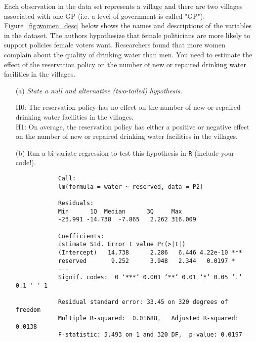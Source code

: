 \documentclass[12pt,letterpaper]{article}
\begin{document}
	\noindent Each observation in the data set represents a village and there are two villages associated with one GP (i.e. a level of government is called "GP"). Figure~\ref{fig:women_desc} below shows the names and descriptions of the variables in the dataset. The authors hypothesize that female politicians are more likely to support policies female voters want. Researchers found that more women complain about the quality of drinking water than men. You need to estimate the effect of the reservation policy on the number of new or repaired drinking water facilities in the villages.
	\vspace{.5cm}
	
	\begin{enumerate}
		\item [(a)] \emph{State a null and alternative (two-tailed) hypothesis.}
		\vspace{.5cm}
		
		\noindent  
		H0: The reservation policy has no effect on the number of new or repaired 
		drinking water facilities in the villages. \\
		
		H1: On average, the reservation policy has either a positive or negative effect on the number of new or repaired drinking water facilities in the villages.\\
		
		\vspace{.5cm}
		
		\newpage
		\item [(b)] Run a bi-variate regression to test this hypothesis in \texttt{R} (include your code!).
		
		
		
		\begin{verbatim} 
			Call:
			lm(formula = water ~ reserved, data = P2)
			
			Residuals:
			Min      1Q  Median      3Q     Max 
			-23.991 -14.738  -7.865   2.262 316.009 
			
			Coefficients:
			Estimate Std. Error t value Pr(>|t|)    
			(Intercept)   14.738      2.286   6.446 4.22e-10 ***
			reserved       9.252      3.948   2.344   0.0197 *  
			---
			Signif. codes:  0 ‘***’ 0.001 ‘**’ 0.01 ‘*’ 0.05 ‘.’ 0.1 ‘ ’ 1
			
			Residual standard error: 33.45 on 320 degrees of freedom
			Multiple R-squared:  0.01688,	Adjusted R-squared:  0.0138 
			F-statistic: 5.493 on 1 and 320 DF,  p-value: 0.0197
		\end{verbatim}
		\vspace{.5cm}
		

\end{enumerate}
\end{document}
